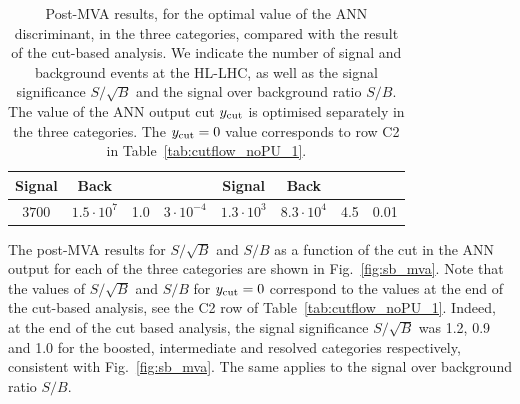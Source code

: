 \begin{table}[t]
\begin{tabular}{c|c|c|c||c|c|c|c}
        Signal & Back   &     &   &  Signal & Back   &     &    \\
    \hline
    $3700$   &   $1.5\cdot 10^{7}$   & 1.0     &  $3\cdot 10^{-4}$   & $1.3\cdot 10^{3}$ &
    $8.3\cdot 10^{4}$  & 4.5 & 0.01 \\
        \hline
  \end{tabular}
  \caption{\small Post-MVA results, for the optimal value of the
    ANN discriminant, in the three categories, compared with the
    result of the cut-based analysis.
    We indicate the number of signal and
    background events
    at the HL-LHC, as well as the signal significance $S/\sqrt{B}$ and
    the signal over background ratio $S/B$.
    The value of the ANN output cut $y_{\rm cut}$
    is optimised separately in the
    three categories.
    The $y_{\rm cut}=0$ value corresponds to row C2 in Table~\ref{tab:cutflow_noPU_1}.
    \label{table:cutflowMVA}
  }
\end{table}

The post-MVA results for $S/\sqrt{B}$ and $S/B$ as a function of the cut
in the ANN output for each of the three categories are shown in
Fig.~\ref{fig:sb_mva}.
%
Note that the values of $S/\sqrt{B}$ and $S/B$
for $y_{\rm cut}=0$ correspond to the values at
the end of the cut-based analysis, see
the C2 row of Table~\ref{tab:cutflow_noPU_1}.
%
Indeed, at the end of the cut based analysis, the
signal significance $S/\sqrt{B}$ was
1.2, 0.9 and 1.0 for the boosted, intermediate and resolved
categories respectively, consistent with Fig.~\ref{fig:sb_mva}.
%
The same applies to the signal over background ratio $S/B$.

